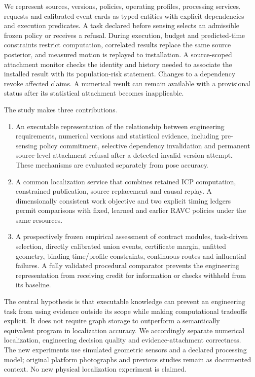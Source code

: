 We represent sources, versions, policies, operating profiles, processing services, requests and calibrated event cards as typed entities with explicit dependencies and execution predicates. A task declared before sensing selects an admissible frozen policy or receives a refusal. During execution, budget and predicted-time constraints restrict computation, correlated results replace the same source posterior, and measured motion is replayed to installation. A source-scoped attachment monitor checks the identity and history needed to associate the installed result with its population-risk statement. Changes to a dependency revoke affected claims. A numerical result can remain available with a provisional status after its statistical attachment becomes inapplicable.

The study makes three contributions.
\begin{enumerate}
\item An executable representation of the relationship between engineering requirements, numerical versions and statistical evidence, including pre-sensing policy commitment, selective dependency invalidation and permanent source-level attachment refusal after a detected invalid version attempt. These mechanisms are evaluated separately from pose accuracy.
\item A common localization service that combines retained ICP computation, constrained publication, source replacement and causal replay. A dimensionally consistent work objective and two explicit timing ledgers permit comparisons with fixed, learned and earlier RAVC policies under the same resources.
\item A prospectively frozen empirical assessment of contract modules, task-driven selection, directly calibrated union events, certificate margin, unfitted geometry, binding time/profile constraints, continuous routes and influential failures. A fully validated procedural comparator prevents the engineering representation from receiving credit for information or checks withheld from its baseline.
\end{enumerate}

The central hypothesis is that executable knowledge can prevent an engineering task from using evidence outside its scope while making computational tradeoffs explicit. It does not require graph storage to outperform a semantically equivalent program in localization accuracy. We accordingly separate numerical localization, engineering decision quality and evidence-attachment correctness. The new experiments use simulated geometric sensors and a declared processing model; original platform photographs and previous studies remain as documented context. No new physical localization experiment is claimed.

